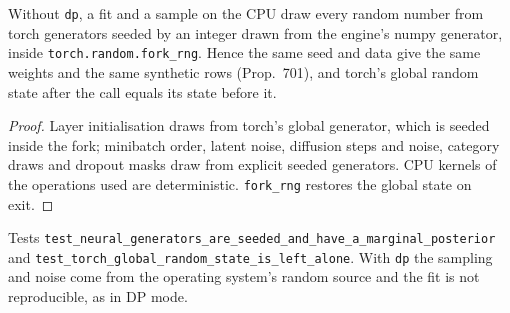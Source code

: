 \setcounter{proposition}{1803}
\begin{proposition}\label{prop:nnseed}
Without \texttt{dp}, a fit and a sample on the CPU draw every random number from torch generators seeded by an integer drawn from the engine's numpy generator, inside \texttt{torch.random.fork\_rng}. Hence the same seed and data give the same weights and the same synthetic rows (Prop.~701), and torch's global random state after the call equals its state before it.
\end{proposition}
\begin{proof}
Layer initialisation draws from torch's global generator, which is seeded inside the fork; minibatch order, latent noise, diffusion steps and noise, category draws and dropout masks draw from explicit seeded generators. CPU kernels of the operations used are deterministic. \texttt{fork\_rng} restores the global state on exit.
\end{proof}
\noindent Tests \texttt{test\_neural\_generators\_are\_seeded\_and\_have\_a\_marginal\_posterior} and \texttt{test\_torch\_global\_random\_state\_is\_left\_alone}. With \texttt{dp} the sampling and noise come from the operating system's random source and the fit is not reproducible, as in DP mode.

